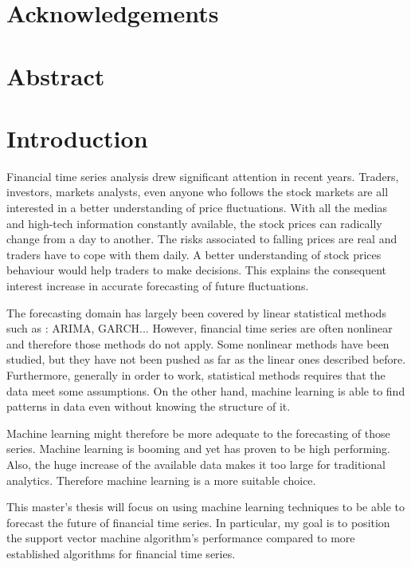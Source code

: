 \documentclass[11pt,a4paper,oneside]{book}
\begin{document}
\chapter*{Acknowledgements}


\tableofcontents


\chapter*{Abstract}


\chapter{Introduction}


Financial time series analysis drew significant attention in recent years. Traders, investors, markets analysts, even anyone who follows the stock markets are all interested in a better understanding of price fluctuations. With all the medias and high-tech information constantly available, the stock prices can radically change from a day to another. 
The risks associated to falling prices are real and traders have to cope with them daily. A better understanding of stock prices behaviour would help traders to make decisions. This explains the consequent interest increase in accurate forecasting of future fluctuations.

The forecasting domain has largely been covered by linear statistical methods such as : ARIMA, GARCH... However, financial time series are often nonlinear and therefore those methods do not apply. Some nonlinear methods have been studied, but they have not been pushed as far as the linear ones described before. Furthermore, generally in order to work, statistical methods requires that the data meet some assumptions. On the other hand, machine learning is able to find patterns in data even without knowing the structure of it. 

Machine learning might therefore be more adequate to the forecasting of those series. Machine learning is booming and yet has proven to be high performing. Also, the huge increase of the available data makes it too large for traditional analytics. Therefore machine learning is a more suitable choice.

This master's thesis will focus on using machine learning techniques to be able to forecast the future of financial time series. In particular, my goal is to position the support vector machine algorithm's performance compared to more established algorithms for financial time series.
\end{document}
